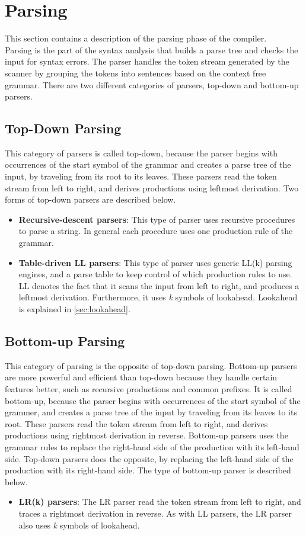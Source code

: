 \section{Parsing}
This section contains a description of the parsing phase of the compiler. 
\\Parsing is the part of the syntax analysis that builds a parse tree and checks the input for syntax errors. The parser handles the token stream generated by the scanner by grouping the tokens into sentences based on the context free grammar. There are two different categories of parsers, top-down and bottom-up parsers.

\subsection{Top-Down Parsing}
This category of parsers is called top-down, because the parser begins with occurrences of the start symbol of the grammar and creates a parse tree of the input, by traveling from its root to its leaves. These parsers read the token stream from left to right, and derives productions using leftmost derivation. Two forms of top-down parsers are described below. 

\begin{itemize}
\item \textbf{Recursive-descent parsers}: This type of parser uses recursive procedures to parse a string.  In general each procedure uses one production rule of the grammar.
\item \textbf{Table-driven LL parsers}: This type of parser uses generic LL(k) parsing engines, and a parse table to keep control of which production rules to use. LL denotes the fact that it scans the input from left to right, and produces a leftmost derivation. Furthermore, it uses \textit{k} symbols of lookahead. Lookahead is explained in \ref{sec:lookahead}.
\end{itemize}

\subsection{Bottom-up Parsing}
This category of parsing is the opposite of top-down parsing. Bottom-up parsers are more powerful and efficient than top-down because they handle certain features better, such as recursive productions and common prefixes. It is called bottom-up, because the parser begins with occurrences of the start symbol of the grammer, and creates a parse tree of the input by traveling from its leaves to its root. These parsers read the token stream from left to right, and derives productions using rightmost derivation in reverse. Bottom-up parsers uses the grammar rules to replace the right-hand side of the production with its left-hand side. Top-down parsers does the opposite, by replacing the left-hand side of the production with its right-hand side. The type of bottom-up parser is described below. 

\begin{itemize}
\item \textbf{LR(k) parsers}: The LR parser read the token stream from left to right, and traces a rightmost derivation in reverse. As with LL parsers, the LR parser also uses \textit{k} symbols of lookahead.  
\end{itemize}
